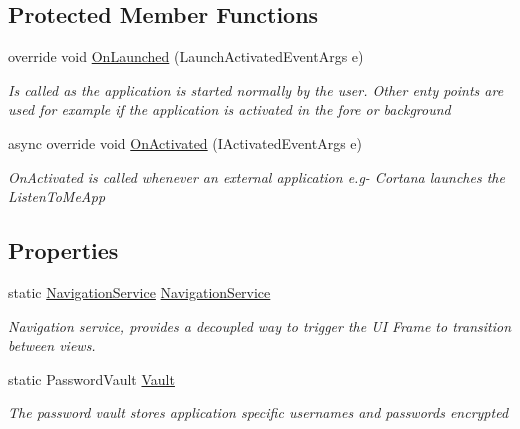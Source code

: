 \subsection*{Protected Member Functions}
\begin{DoxyCompactItemize}
\item 
override void \hyperlink{class_listen_to_me_1_1_app_ace89a3624e2de8cc528dea8b1288d03f}{On\+Launched} (Launch\+Activated\+Event\+Args e)
\begin{DoxyCompactList}\small\item\em Is called as the application is started normally by the user. Other enty points are used for example if the application is activated in the fore or background \end{DoxyCompactList}\item 
async override void \hyperlink{class_listen_to_me_1_1_app_a3e2da49bb555b7fdc5858f5442d396e4}{On\+Activated} (I\+Activated\+Event\+Args e)
\begin{DoxyCompactList}\small\item\em On\+Activated is called whenever an external application e.\+g-\/ Cortana launches the Listen\+To\+Me\+App \end{DoxyCompactList}\end{DoxyCompactItemize}
\subsection*{Properties}
\begin{DoxyCompactItemize}
\item 
static \hyperlink{class_listen_to_me_1_1_common_1_1_navigation_service}{Navigation\+Service} \hyperlink{class_listen_to_me_1_1_app_ae35ddc10bf8aad1a80c92c71c6e3b7fc}{Navigation\+Service}
\begin{DoxyCompactList}\small\item\em Navigation service, provides a decoupled way to trigger the UI Frame to transition between views. \end{DoxyCompactList}\item 
static Password\+Vault \hyperlink{class_listen_to_me_1_1_app_ad1b3a77f44f52055446727716abfccc6}{Vault}
\begin{DoxyCompactList}\small\item\em The password vault stores application specific usernames and passwords encrypted \end{DoxyCompactList}\end{DoxyCompactItemize}


